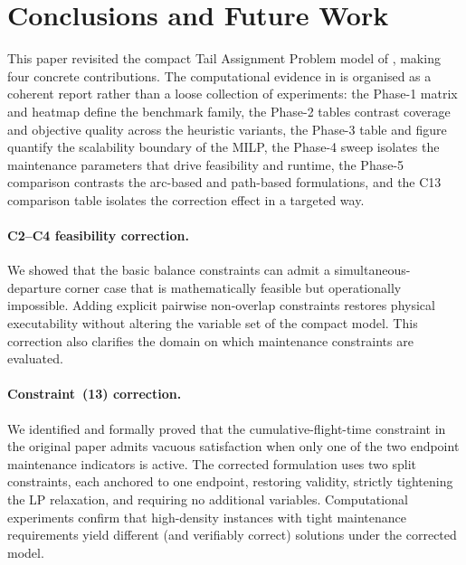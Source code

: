 \section{Conclusions and Future Work}
\label{sec:conclusion}

This paper revisited the compact Tail Assignment Problem model of
\citet{khaled2018compact}, making four concrete contributions.  The
computational evidence in  is organised as a coherent
report rather than a loose collection of experiments: the Phase-1 matrix and
heatmap define the benchmark family, the Phase-2 tables contrast coverage and
objective quality across the heuristic variants, the Phase-3 table and figure
quantify the scalability boundary of the MILP, the Phase-4 sweep isolates the
maintenance parameters that drive feasibility and runtime, the Phase-5
comparison contrasts the arc-based and path-based formulations, and the C13
comparison table isolates the correction effect in a targeted way.

\paragraph{C2--C4 feasibility correction.}
We showed that the basic balance constraints can admit a simultaneous-
departure corner case that is mathematically feasible but operationally
impossible.  Adding explicit pairwise non-overlap constraints restores
physical executability without altering the variable set of the compact model.
This correction also clarifies the domain on which maintenance constraints are
evaluated.

\paragraph{Constraint~(13) correction.}
We identified and formally proved that the cumulative-flight-time constraint in
the original paper admits vacuous satisfaction when only one of the two
endpoint maintenance indicators is active.  The corrected formulation uses two split constraints, each anchored to one
endpoint, restoring validity, strictly tightening the LP relaxation, and
requiring no additional variables.  Computational experiments confirm that
high-density instances with tight maintenance requirements yield different
(and verifiably correct) solutions under the corrected model.

